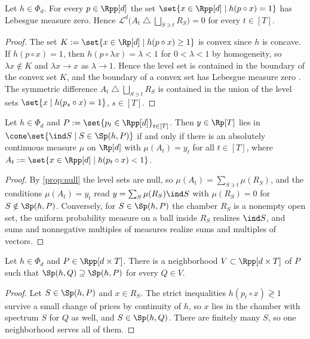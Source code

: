 \begin{proposition}\label{prop:null}
Let $h\in\Phi_d$. For every $p\in\Rpp[d]$ the set $\set{x\in\Rpp[d]\mid h(p\circ x)=1}$ has Lebesgue measure zero. Hence $\mathcal L^d\bigl(A_t\mathbin{\triangle}\bigsqcup_{S\ni t}R_S\bigr)=0$ for every $t\in[T]$.
\end{proposition}

\begin{proof}
The set $K:=\set{x\in\Rp[d]\mid h(p\circ x)\ge1}$ is convex since $h$ is concave. If $h(p\circ x)=1$, then $h(p\circ\lambda x)=\lambda<1$ for $0<\lambda<1$ by homogeneity, so $\lambda x\notin K$ and $\lambda x\to x$ as $\lambda\to1$. Hence the level set is contained in the boundary of the convex set $K$, and the boundary of a convex set has Lebesgue measure zero \citep{Lang1986}. The symmetric difference $A_t\mathbin{\triangle}\bigsqcup_{S\ni t}R_S$ is contained in the union of the level sets $\set{x\mid h(p_s\circ x)=1}$, $s\in[T]$.
\end{proof}

\begin{lemma}[signature]\label{lem:signature}
Let $h\in\Phi_d$ and $P:=\set{p_t\in\Rpp[d]}_{t\in[T]}$. Then $y\in\Rp[T]$ lies in $\cone\set{\ind S\mid S\in\Sp(h,P)}$ if and only if there is an absolutely continuous measure $\mu$ on $\Rp[d]$ with $\mu(A_t)=y_t$ for all $t\in[T]$, where $A_t:=\set{x\in\Rpp[d]\mid h(p_t\circ x)<1}$.
\end{lemma}

\begin{proof}
By \cref{prop:null} the level sets are null, so $\mu(A_t)=\sum_{S\ni t}\mu(R_S)$, and the conditions $\mu(A_t)=y_t$ read $y=\sum_S\mu(R_S)\ind S$ with $\mu(R_S)=0$ for $S\notin\Sp(h,P)$. Conversely, for $S\in\Sp(h,P)$ the chamber $R_S$ is a nonempty open set, the uniform probability measure on a ball inside $R_S$ realizes $\ind S$, and sums and nonnegative multiples of measures realize sums and multiples of vectors.
\end{proof}

\begin{lemma}[stability]\label{lem:stability}
Let $h\in\Phi_d$ and $P\in\Rpp[d\times T]$. There is a neighborhood $V\subset\Rpp[d\times T]$ of $P$ such that $\Sp(h,Q)\supseteq\Sp(h,P)$ for every $Q\in V$.
\end{lemma}

\begin{proof}
Let $S\in\Sp(h,P)$ and $x\in R_S$. The strict inequalities $h(p_t\circ x)\gtrless1$ survive a small change of prices by continuity of $h$, so $x$ lies in the chamber with spectrum $S$ for $Q$ as well, and $S\in\Sp(h,Q)$. There are finitely many $S$, so one neighborhood serves all of them.
\end{proof}

